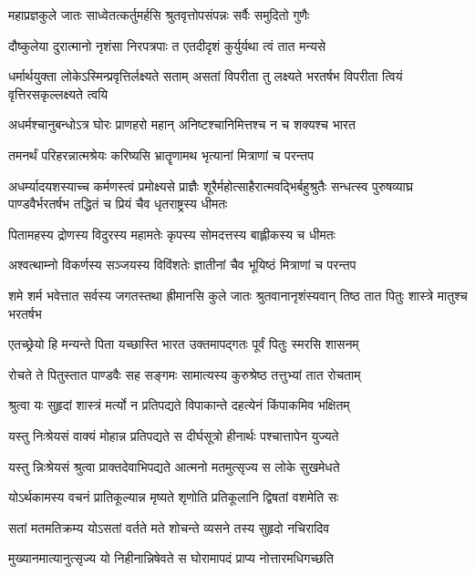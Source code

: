 \twolineshloka
{महाप्रज्ञकुले जातः साध्वेतत्कर्तुमर्हसि}
{श्रुतवृत्तोपसंपन्नः सर्वैः समुदितो गुणैः}


\twolineshloka
{दौष्कुलेया दुरात्मानो नृशंसा निरपत्रपाः}
{त एतदीदृशं कुर्युर्यथा त्वं तात मन्यसे}


\threelineshloka
{धर्मार्थयुक्ता लोकेऽस्मिन्प्रवृत्तिर्लक्ष्यते सताम्}
{असतां विपरीता तु लक्ष्यते भरतर्षभ}
{विपरीता त्वियं वृत्तिरसकृल्लक्ष्यते त्वयि}


\twolineshloka
{अधर्मश्चानुबन्धोऽत्र घोरः प्राणहरो महान्}
{अनिष्टश्चानिमित्तश्च न च शक्यश्च भारत}


\twolineshloka
{तमनर्थं परिहरन्नात्मश्रेयः करिष्यसि}
{भ्रातॄणामथ भृत्यानां मित्राणां च परन्तप}


अधर्म्यादयशस्याच्च कर्मणस्त्वं प्रमोक्ष्यसे
\threelineshloka
{प्राज्ञैः शूरैर्महोत्साहैरात्मवद्भिर्बहुश्रुतैः}
{सन्धत्स्व पुरुषव्याघ्र पाण्डवैर्भरतर्षभ}
{तद्धितं च प्रियं चैव धृतराष्ट्रस्य धीमतः}


\twolineshloka
{पितामहस्य द्रोणस्य विदुरस्य महामतेः}
{कृपस्य सोमदत्तस्य बाह्लीकस्य च धीमतः}


\twolineshloka
{अश्वत्थाम्नो विकर्णस्य सञ्जयस्य विविंशतेः}
{ज्ञातीनां चैव भूयिष्ठं मित्राणां च परन्तप}


\threelineshloka
{शमे शर्म भवेत्तात सर्वस्य जगतस्तथा}
{ह्रीमानसि कुले जातः श्रुतवानानृशंस्यवान्}
{तिष्ठ तात पितुः शास्त्रे मातुश्च भरतर्षभ}


\twolineshloka
{एतच्छ्रेयो हि मन्यन्ते पिता यच्छास्ति भारत}
{उक्तमापद्गतः पूर्वं पितुः स्मरसि शासनम्}


\twolineshloka
{रोचते ते पितुस्तात पाण्डवैः सह सङ्गमः}
{सामात्यस्य कुरुश्रेष्ठ तत्तुभ्यां तात रोचताम्}


\twolineshloka
{श्रुत्वा यः सुहृदां शास्त्रं मर्त्यो न प्रतिपद्यते}
{विपाकान्ते दहत्येनं किंपाकमिव भक्षितम्}


\twolineshloka
{यस्तु निःश्रेयसं वाक्यं मोहान्न प्रतिपद्यते}
{स दीर्घसूत्रो हीनार्थः पश्चात्तापेन युज्यते}


\twolineshloka
{यस्तु न्निःश्रेयसं श्रुत्वा प्राक्तदेवाभिपद्यते}
{आत्मनो मतमुत्सृज्य स लोके सुखमेधते}


\twolineshloka
{योऽर्थकामस्य वचनं प्रातिकूल्यान्न मृष्यते}
{शृणोति प्रतिकूलानि द्विषतां वशमेति सः}


\twolineshloka
{सतां मतमतिक्रम्य योऽसतां वर्तते मते}
{शोचन्ते व्यसने तस्य सुहृदो नचिरादिव}


\twolineshloka
{मुख्यानमात्यानुत्सृज्य यो निहीनान्निषेवते}
{स घोरामापदं प्राप्य नोत्तारमधिगच्छति}


